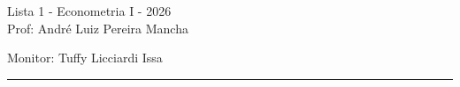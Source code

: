 \documentclass[12pt,letterpaper, onecolumn]{exam}
\begin{document}
\begingroup  
    \centering
    \LARGE Lista 1 - Econometria I - 2026\\[0.5em]
    \large Prof: André Luiz Pereira Mancha \par
    \large Monitor: Tuffy Licciardi Issa  \par
\endgroup
\rule{\textwidth}{0.4pt}
\pointsdroppedatright   %
\printanswers
\renewcommand{\solutiontitle}{\noindent\textbf{Ans:}\enspace}   %
\end{document}
